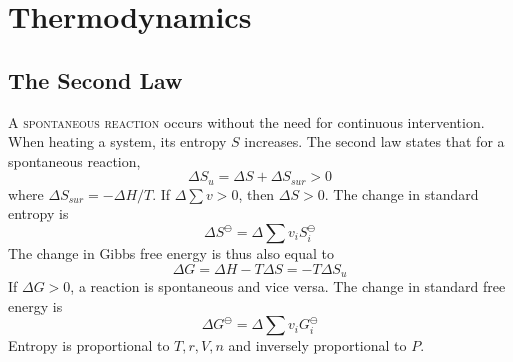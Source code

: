 \documentclass{tufte-book}
\begin{document}
\chapter{Thermodynamics}

\section{The Second Law}
\textsc{A spontaneous reaction} occurs without the need for continuous intervention. When heating a system, its entropy $S$ increases. The second law states that for a spontaneous reaction, \begin{equation}
  \Delta S_u = \Delta S + \Delta S_{sur} > 0
\end{equation}
where $\Delta S_{sur} = - \Delta H/T$. If $\Delta \sum v > 0$, then $\Delta S > 0$. The change in standard entropy is \begin{equation}
  \Delta S^\ominus = \Delta \sum v_i S^\ominus_i
\end{equation}
The change in Gibbs free energy is thus also equal to \begin{equation}
  \Delta G = \Delta H - T \Delta S = -T \Delta S_u
\end{equation}
If $\Delta G > 0$, a reaction is spontaneous and vice versa. The change in standard free energy is \begin{equation}
  \Delta G^\ominus = \Delta \sum v_i G^\ominus_i
\end{equation}
Entropy is proportional to $T, r, V, n$ and inversely proportional to $P$.
\end{document}
